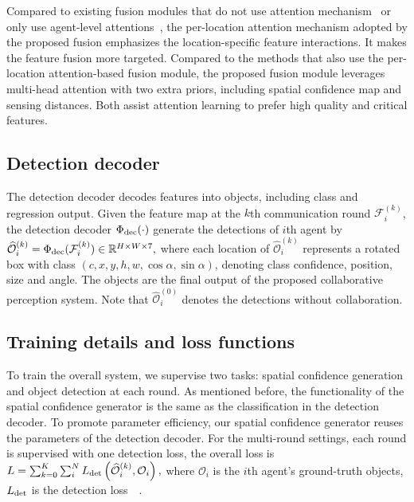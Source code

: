 \documentclass{article}
\begin{document}
Compared to existing fusion modules that do not use attention mechanism~\cite{v2vnet} or only use agent-level attentions~\cite{when2com}, the per-location attention mechanism adopted by the proposed fusion emphasizes the location-specific feature interactions. It  makes the feature fusion more targeted. Compared to the methods that also use the per-location attention-based fusion module\cite{disconet,OPV2V,xu2022v2x}, the proposed fusion module leverages multi-head attention with two extra priors, including spatial confidence map and sensing distances. Both assist attention learning to prefer high quality and critical features.

\vspace{-2mm}
\subsection{Detection decoder}
\label{sec:Decoder}
\vspace{-2mm}
The detection decoder decodes features into objects, including class and regression output. 
Given the feature map at the $k$th communication round $\mathcal{F}_i^{(k)}$, the detection decoder $\Phi_{\rm dec}(\cdot)$ generate the detections of $i$th agent by
$
     \widehat{\mathcal{O}}_i^{(k)}  =  \Phi_{\rm dec}(\mathcal{F}_i^{(k)}) \in \mathbb{R}^{H \times W \times 7},
$
where each location of $\widehat{\mathcal{O}}_i^{(k)}$ represents a rotated box with class $(c,x,y,h,w, \cos\alpha, \sin\alpha)$, denoting class confidence, position, size and angle. The objects are the final output of the proposed collaborative perception system. Note that $\widehat{\mathcal{O}}_i^{(0)}$ denotes the detections without collaboration.

\vspace{-2mm}
\subsection{Training details and loss functions}
\vspace{-2mm}
To train the overall system, we supervise two tasks: spatial confidence generation and object detection at each round. As mentioned before, the functionality of the spatial confidence generator is the same as the classification in the detection decoder. To promote parameter efficiency, our spatial confidence generator reuses the parameters of the detection decoder. For the multi-round settings, each round is supervised with one detection loss, the overall loss is
$
    L = \sum_{k=0}^K\sum_i^{N} L_{\rm det} \left(\widehat{\mathcal{O}}_i^{(k)},\mathcal{O}_i \right),
$
where $\mathcal{O}_i$ is the $i$th agent's ground-truth objects, $L_{\rm det}$ is the detection loss~~\cite{zhou2019objects}.
\end{document}
